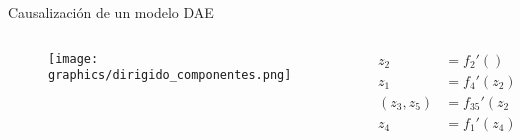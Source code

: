 \begin{frame}[fragile]{Causalización de un modelo DAE}
    \begin{columns}
        \begin{column}{0.5\textwidth}
            \begin{figure}
               \centering
               \texttt{[image: graphics/dirigido\_componentes.png]}
            \end{figure}
        \end{column}  
        \begin{column}{0.5\textwidth}
            \begin{align*}
            z_2 &= f_2'() \\
            z_1 &= f_4'(z_2) \\
            (z_3, z_5) &= f_{35}'(z_2) \\
            z_4 &= f_1'(z_4) \\
            \end{align*}
        \end{column}
    \end{columns}
\end{frame}
